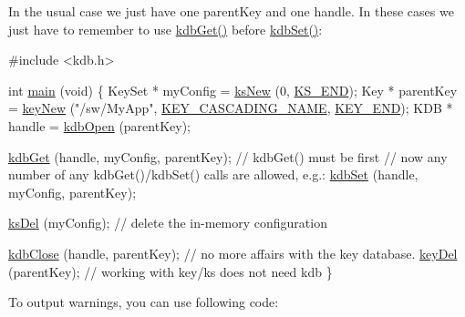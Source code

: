 In the usual case we just have one parent\+Key and one handle. In these cases we just have to remember to use \hyperlink{group__kdb_ga28e385fd9cb7ccfe0b2f1ed2f62453a1}{kdb\+Get()} before \hyperlink{group__kdb_ga11436b058408f83d303ca5e996832bcf}{kdb\+Set()}\+:


\begin{DoxyCodeInclude}

\textcolor{preprocessor}{#include <kdb.h>}

\textcolor{keywordtype}{int} \hyperlink{testio__doc_8c_a3c04138a5bfe5d72780bb7e82a18e627}{main} (\textcolor{keywordtype}{void})
\{
        KeySet * myConfig = \hyperlink{group__keyset_ga671e1aaee3ae9dc13b4834a4ddbd2c3c}{ksNew} (0, \hyperlink{group__keyset_ga7a28fce3773b2c873c94ac80b8b4cd54}{KS\_END});
        Key * parentKey = \hyperlink{group__key_gad23c65b44bf48d773759e1f9a4d43b89}{keyNew} (\textcolor{stringliteral}{"/sw/MyApp"}, \hyperlink{group__key_gga9b703ca49f48b482def322b77d3e6bc8afc1567f74444ff9c219f7456b652b4ec}{KEY\_CASCADING\_NAME}, 
      \hyperlink{group__key_gga9b703ca49f48b482def322b77d3e6bc8aa8adb6fcb92dec58fb19410eacfdd403}{KEY\_END});
        KDB * handle = \hyperlink{group__kdb_ga6808defe5870f328dd17910aacbdc6ca}{kdbOpen} (parentKey);

        \hyperlink{group__kdb_ga28e385fd9cb7ccfe0b2f1ed2f62453a1}{kdbGet} (handle, myConfig, parentKey); \textcolor{comment}{// kdbGet() must be first}
        \textcolor{comment}{// now any number of any kdbGet()/kdbSet() calls are allowed, e.g.:}
        \hyperlink{group__kdb_ga11436b058408f83d303ca5e996832bcf}{kdbSet} (handle, myConfig, parentKey);

        \hyperlink{group__keyset_ga27e5c16473b02a422238c8d970db7ac8}{ksDel} (myConfig); \textcolor{comment}{// delete the in-memory configuration}

        \hyperlink{group__kdb_gadb54dc9fda17ee07deb9444df745c96f}{kdbClose} (handle, parentKey); \textcolor{comment}{// no more affairs with the key database.}
        \hyperlink{group__key_ga3df95bbc2494e3e6703ece5639be5bb1}{keyDel} (parentKey);             \textcolor{comment}{// working with key/ks does not need kdb}
\}
\end{DoxyCodeInclude}


To output warnings, you can use following code\+:


